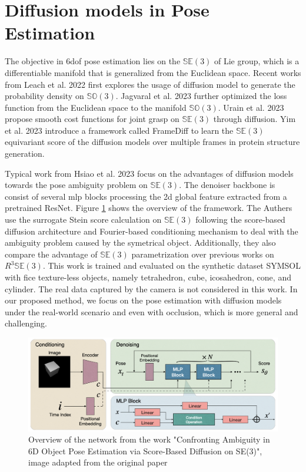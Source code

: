 \documentclass[12pt,DIV14,BCOR12mm,a4paper,footinclude=false,headinclude,parskip=half-,twoside,openright,cleardoublepage=empty,toc=index,bibliography=totoc,listof=totoc]{scrreprt}
\numberwithin{equation}{chapter}
\begin{document}
\section{Diffusion models in Pose Estimation}
The objective in \gls{6dof} pose estimation lies on the $\mathbb{SE}(3)$ of Lie group, which is a differentiable manifold that is generalized from the Euclidean space. Recent works from Leach et al. 2022 \cite{leach2022denoising} first explores the usage of diffusion model to generate the probability density on $\mathbb{SO}(3)$. Jagvaral et al. 2023 \cite{jagvaral2023diffusion} further optimized the loss function from the Euclidean space to the manifold $\mathbb{SO}(3)$. Urain et al. 2023 \cite{urain2023se3diffusionfields} propose smooth cost functions for joint grasp on $\mathbb{SE}(3)$ through diffusion. Yim et al. 2023 \cite{yim2023se3} introduce a framework called FrameDiff to learn the $\mathbb{SE}(3)$ equivariant score of the diffusion models over multiple frames in protein structure generation. 

Typical work from Hsiao et al. 2023 \cite{hsiao2023confronting} focus on the advantages of diffusion models towards the pose ambiguity problem on $\mathbb{SE}(3)$. The denoiser backbone is consist of several \gls{mlp} blocks processing the \gls{2d} global feature extracted from a pretrained ResNet. Figure \ref{img:confront} shows the overview of the framework. The Authers use the surrogate Stein score calculation on $\mathbb{SE}(3)$ following the score-based diffusion architecture and Fourier-based conditioning mechanism to deal with the ambiguity problem caused by the symetrical object. Additionally, they also compare the advantage of $\mathbb{SE}(3)$ parametrization over previous works on $R^{3}\mathbb{SE}(3)$. This work is trained and evaluated on the synthetic dataset SYMSOL \cite{implicitpdf2021} with fice texture-less objects, namely tetrahedron, cube, icosahedron, cone, and cylinder. The real data captured by the camera is not considered in this work. In our proposed method, we focus on the pose estimation with diffusion models under the real-world scenario and even with occlusion, which is more general and challenging.
\begin{figure}[h]
	\centering
	\includegraphics[scale=0.24]{img/confront.png}
	\caption{Overview of the network from the work "Confronting Ambiguity in 6D Object Pose Estimation via Score-Based Diffusion on SE(3)", image adapted from the original paper \cite{hsiao2023confronting}}
	\label{img:confront}
\end{figure}
\end{document}
